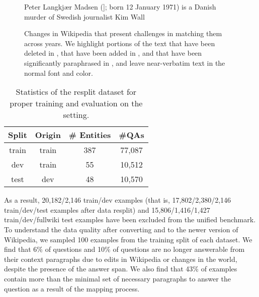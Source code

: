 \begin{figure*}
{{\begin{framed}
    \end{framed}}
    \parbox{0.45\textwidth}{%
    \begin{framed}
    Peter Langkj\ae{}r Madsen (]; born 12 January 1971) is a Danish  murder of Swedish journalist Kim Wall 
    \end{framed}}
    \label{fig:wiki_changes:peter_madsen}
    }
    \caption{Changes in Wikipedia that present challenges in matching them across years. We highlight portions of the text that have been deleted in , that have been added in , and that have been significantly paraphrased in , and leave near-verbatim text in the normal font and color.}
    \label{fig:wiki_changes}
\end{figure*}

\begin{table}
    \centering
    \begin{tabular}{cccc}
    \toprule
         Split & Origin & \# Entities & \#QAs \\
    \midrule
        train & train & 387 & 77,087 \\
        dev & train & \phantom{0}55 & 10,512 \\
        test & dev & \phantom{0}48 & 10,570 \\
    \bottomrule
    \end{tabular}
    \caption{Statistics of the resplit \squad{} dataset for proper training and evaluation on the \squadopen{} setting.}
    \label{tab:squad_resplit}
\end{table}

As a result, 20,182/2,146 \squad{} train/dev examples (that is, 17,802/2,380/2,146 train/dev/test examples after data resplit) and 15,806/1,416/1,427 \hotpotqa{} train/dev/fullwiki test examples have been excluded from the unified benchmark.
To understand the data quality after converting \squadopen{} and \hotpotqa{} to the newer version of Wikipedia, we sampled 100 examples from the training split of each dataset.
We find that 6\% of \squad{} questions and 10\% of \hotpotqa{} questions are no longer answerable from their context paragraphs due to edits in Wikipedia or changes in the world, despite the presence of the answer span.
We also find that 43\% of \hotpotqa{} examples contain more than the minimal set of necessary paragraphs to answer the question as a result of the mapping process.

